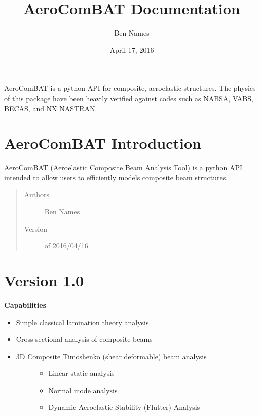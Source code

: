 \documentclass[letterpaper,10pt,english]{sphinxmanual}
\title{AeroComBAT Documentation}
\date{April 17, 2016}
\author{Ben Names}
\begin{document}
\maketitle
\tableofcontents
{}\label{index::doc}


AeroComBAT is a python API for composite, aeroelastic structures. The physics
of this package have been heavily verified against codes such as NABSA, VABS,
BECAS, and NX NASTRAN.


\chapter{AeroComBAT Introduction}
\label{index:welcome-to-aerocombat-s-documentation}\label{index:aerocombat-introduction}
AeroComBAT (Aeroelastic Composite Beam Analysis Tool) is a python API intended
to allow users to efficiently models composite beam structures.
\begin{quote}\begin{description}
\item[{Authors}] \leavevmode
Ben Names

\item[{Version}]  of 2016/04/16

\end{description}\end{quote}


\chapter{Version 1.0}
\label{index:version-1-0}
\textbf{Capabilities}
\begin{itemize}
\item {} 
Simple classical lamination theory analysis

\item {} 
Cross-sectional analysis of composite beams

\item {} \begin{description}
\item[{3D Composite Timoshenko (shear deformable) beam analysis}] \leavevmode\begin{itemize}
\item {} 
Linear static analysis

\item {} 
Normal mode analysis

\item {} 
Dynamic Aeroelastic Stability (Flutter) Analysis

\end{itemize}

\end{description}

\end{itemize}
\end{document}
